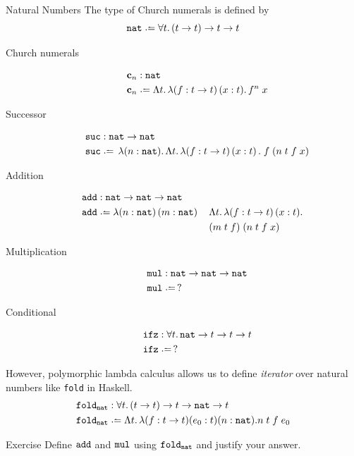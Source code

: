 \begin{frame}[allowframebreaks]{Natural Numbers}
The type of Church numerals is defined by 
\[
  \nat \defeq \forall t.\, (t\to t)\to t\to t
\]
  \begin{description}
    \item[Church numerals]
      \begin{align*}
        \bc_n & : \nat \\
        \bc_n & \defeq \Lambda t.\,\lambda (f:t \to t)\,(x:t).\,
        f^n\;x
      \end{align*}
    \item[Successor]
      \begin{align*}
        \suc & : \nat \to \nat \\
        \suc & \defeq \,\lambda (n : \nat).\,\Lambda t.\,\lambda
        (f : t \to t)\,(x:t)\,.\;f\;(n\;t\;f\;x) 
      \end{align*}
    \item[Addition]
      \begin{align*}
        \add & : \nat \to \nat \to \nat \\
        \add & \defeq \lambda (n : \nat)\,(m:\nat)\,&& \Lambda t.\, \lambda
        (f:t\to t)\,(x: t).\\
        &&& (m\;t\;f)\;(n\;t\;f\;x) 
      \end{align*}
    \item[Multiplication] 
      \begin{align*}
       \mul & : \nat\to \nat \to\nat\\
       \mul & \defeq\,?
      \end{align*}
    \item[Conditional]
      \begin{align*}
       \ifz & : \forall t.\,\nat \to t \to t \to t \\
       \ifz & \defeq\,?
      \end{align*}
  \end{description}
However, polymorphic lambda calculus allows us to define
\emph{iterator} over natural numbers like \texttt{fold} in Haskell.
\begin{align*}
  \mathtt{fold}_{\nat} & : \forall t.\, (t \to t) \to t \to \nat \to t  \\
  \mathtt{fold}_{\nat} & \defeq \Lambda t.\, \lambda (f : t \to t)(e_0 : t)(n : \nat). 
  n\;t\;f\;e_0
\end{align*}

%
%
%
\begin{block}{Exercise}
  Define $\mathtt{add}$ and $\mathtt{mul}$ using $\mathtt{fold}_{\mathtt{nat}}$ and justify your
  answer.
  

\end{block}
\end{frame}
